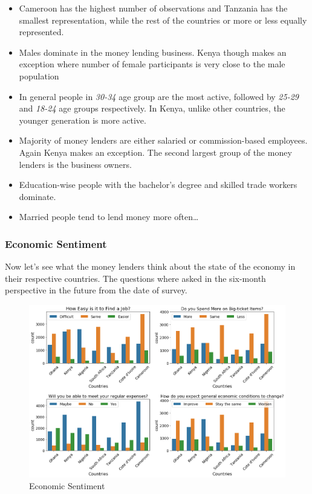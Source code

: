 \begin{itemize}
\tightlist
\item
  Cameroon has the highest number of observations and Tanzania has the
  smallest representation, while the rest of the countries or more or
  less equally represented.
\item
  Males dominate in the money lending business. Kenya though makes an
  exception where number of female participants is very close to the
  male population
\item
  In general people in \emph{30-34} age group are the most active,
  followed by \emph{25-29} and \emph{18-24} age groups respectively. In
  Kenya, unlike other countries, the younger generation is more active.
\item
  Majority of money lenders are either salaried or commission-based
  employees. Again Kenya makes an exception. The second largest group of
  the money lenders is the business owners.
\item
  Education-wise people with the bachelor's degree and skilled trade
  workers dominate.
\item
  Married people tend to lend money more often\ldots{}
\end{itemize}

\hypertarget{economic-sentiment}{%
\subsubsection{Economic Sentiment}\label{economic-sentiment}}

Now let's see what the money lenders think about the state of the
economy in their respective countries. The questions where asked in the
six-month perspective in the future from the date of survey.

\begin{Schunk}
\begin{figure}[H]

{\centering \includegraphics[width=1.15\linewidth]{../../artifacts/sentiment} 

}

\caption[Economic Sentiment]{Economic Sentiment}\label{fig:esent}
\end{figure}
\end{Schunk}

